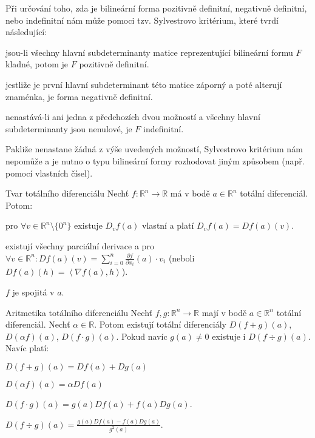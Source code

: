 \begin{poznamka}
Při určování toho, zda je bilineární forma pozitivně definitní, negativně definitní, nebo indefinitní nám může pomoci tzv. Sylvestrovo kritérium, které tvrdí následující:
\begin{pitemize}
\item jsou-li všechny hlavní subdeterminanty matice reprezentující bilineární formu $F$ kladné, potom je $F$ pozitivně definitní.
\item jestliže je první hlavní subdeterminant této matice záporný a poté alterují znaménka, je forma negativně definitní.
\item nenastává-li ani jedna z předchozích dvou možností a všechny hlavní subdeterminanty jsou nenulové, je $F$ indefinitní.
\end{pitemize}
Pakliže nenastane žádná z výše uvedených možností, Sylvestrovo kritérium nám nepomůže a je nutno o typu bilineární formy rozhodovat jiným způsobem (např. pomocí vlastních čísel).
\end{poznamka}

\begin{vetaN}{Tvar totálního diferenciálu}
Nechť $f: \mathbb{R}^n \rightarrow \mathbb{R}$ má v bodě $a \in \mathbb{R}^n$ totální diferenciál. Potom:
\begin{pitemize}
\item pro $\forall v \in \mathbb{R}^n\setminus\{0^n\}$ existuje $D_vf(a)$ vlastní a platí $D_vf(a) = Df(a)(v)$.
\item existují všechny parciální derivace a pro $\forall v \in \mathbb{R}^n: Df(a)(v) = \sum_{i=0}^n\frac{\partial f}{\partial x_i}(a) \cdot v_i$ (neboli $Df(a)(h) = \left<\nabla f(a), h\right>$).
\item $f$ je spojitá v $a$.
\end{pitemize}
\end{vetaN}

\begin{vetaN}{Aritmetika totálního diferenciálu}
Nechť $f, g: \mathbb{R}^n \rightarrow \mathbb{R}$ mají v bodě $a \in \mathbb{R}^n$ totální diferenciál. Nechť $\alpha \in \mathbb{R}$. Potom existují totální diferenciály $D(f + g)(a)$, $D(\alpha f)(a)$, $D(f \cdot g)(a)$. Pokud navíc $g(a) \neq 0$ existuje i $D(f \div g)(a)$. Navíc platí:
\begin{pitemize}
\item $D(f + g)(a) = Df(a) + Dg(a)$
\item $D(\alpha f)(a) = \alpha Df(a)$
\item $D(f \cdot g)(a) = g(a)Df(a) + f(a)Dg(a)$.
\item $D(f \div g)(a) = \frac{g(a)Df(a) - f(a)Dg(a)}{g^2(a)}$.
\end{pitemize}
\end{vetaN}

